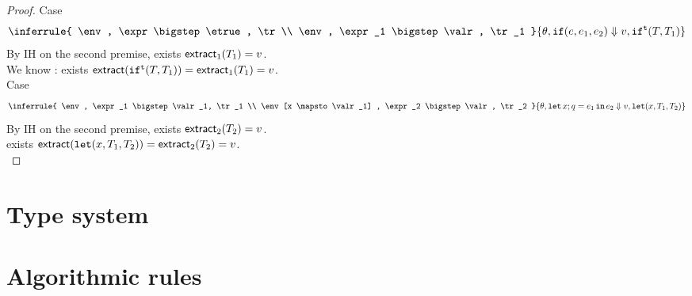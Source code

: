 \documentclass[a4paper,11pt]{article}
\theoremstyle{definition}
\begin{document}
\begin{proof}
%
\textsf{Case}
\[
 \inferrule{
    \env, \expr \bigstep \etrue, \tr \\
    \env, \expr_1 \bigstep \valr, \tr_1
  }{
    \env, \eif(\expr, \expr_1, \expr_2) \bigstep \valr, \trift(\tr, \tr_1)
  }
\]
By IH on the second premise, exists $\mathsf{extract}_1 (T_1) =
v$. \\
We know : 
 exists $\mathsf{extract} ( \mathtt{if}^{\mathtt{t}}(T, T_1) ) =
 \mathsf{extract}_1 (T_1)  = v$.\\
%
\textsf{Case}
\[
\inferrule{
  \env, \expr_1 \bigstep \valr_1, \tr_1 \\
  \env[x \mapsto \valr_1] , \expr_2 \bigstep \valr, \tr_2
}
{\env, \elet x;q = \expr_1 \ein \expr_2 \bigstep \valr, \trlet (x,
  \tr_1, \tr_2) }
\]
By IH on the second premise, exists $\mathsf{extract}_2 (T_2) =
v$. \\
 exists $\mathsf{extract} ( \mathop{\mathtt{let}} (x,
  T_1, T_2)) =
 \mathsf{extract}_2 (T_2)  = v$.\\


\end{proof}
\clearpage



\section{Type system}
\label{ts}



\clearpage



\section{Algorithmic rules}
\label{algorithmic rules}



\clearpage

\end{document}
